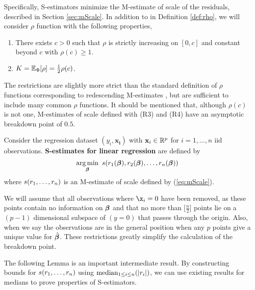 Specifically, S-estimators minimize the M-estimate of scale of the residuals, described in Section \ref{sec:mScale}. In addition to in Definition \ref{def:rho}, we will consider $\rho$ function with the following properties,
\begin{enumerate}[(R1)]\addtocounter{enumi}{3}
    \item There exists $c > 0$ such that $\rho$ is strictly increasing on $[0,c]$ and constant beyond $c$ with $\rho(c) \geq 1$.
    \item $K = \mathbb{E}_\Phi[\rho] = \frac{1}{2} \rho(c)$.
\end{enumerate}
The restrictions are slightly more strict than the standard definition of $\rho$ functions corresponding to redescending M-estimates \cite{maronna2019robust}, but are sufficient to include many common $\rho$ functions. It should be mentioned that, although $\rho(c)$ is not one, M-estimates of scale defined with (R3) and (R4) have an asymptotic breakdown point of $0.5$.

\begin{defn}
\label{def:sEst}
Consider the regression dataset $(y_i, \mathbf{x_i})$ with $\mathbf{x}_i \in \mathbb{R}^p$ for $i = 1,\hdots,n$ iid observations. \textbf{S-estimates for linear regression} are defined by
 \begin{equation}
\label{eq:sEst}
     \operatorname*{arg\,min}_{\bm{\beta}}\ s(r_1(\bm{\beta}), r_2(\bm{\beta}), \hdots, r_n(\bm{\beta}))
 \end{equation}
 where $s(r_1,\hdots, r_n)$ is an M-estimate of scale defined by (\ref{eq:mScale}). \\
\end{defn}
We will assume that all observations where $\x_i=0$ have been removed, as these points contain no information on $\bm{\beta}$ and that no more than $\big[\frac{n}{2}\big]$ points lie on a $(p-1)$ dimensional subspace of $(y=0)$ that passes through the origin. Also, when we say the observations are in the general position when any $p$ points give a unique value for $\hat{\bm{\beta}}$. These restrictions greatly simplify the calculation of the breakdown point.

The following Lemma is an important intermediate result. By constructing bounds for $s(r_1,\hdots, r_n)$ using $\operatorname*{median}_{1\leq i \leq n}(|r_i|) $, we can use existing results for medians to prove properties of S-estimators.

